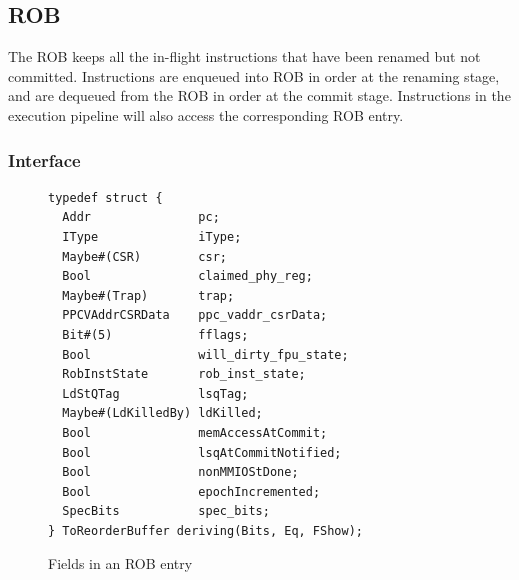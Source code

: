 \subsection{ROB}\label{sec:rob}

The ROB keeps all the in-flight instructions that have been renamed but not committed.
Instructions are enqueued into ROB in order at the renaming stage, and are dequeued from the ROB in order at the commit stage.
Instructions in the execution pipeline will also access the corresponding ROB entry.

\subsubsection{Interface}

\begin{figure}[!htb]
\begin{lstlisting}[caption={}]
typedef struct {
  Addr               pc;
  IType              iType;
  Maybe#(CSR)        csr;
  Bool               claimed_phy_reg;
  Maybe#(Trap)       trap;
  PPCVAddrCSRData    ppc_vaddr_csrData;
  Bit#(5)            fflags;
  Bool               will_dirty_fpu_state;
  RobInstState       rob_inst_state;
  LdStQTag           lsqTag;
  Maybe#(LdKilledBy) ldKilled;
  Bool               memAccessAtCommit;
  Bool               lsqAtCommitNotified;
  Bool               nonMMIOStDone;
  Bool               epochIncremented;
  SpecBits           spec_bits;
} ToReorderBuffer deriving(Bits, Eq, FShow);
\end{lstlisting}
\caption{Fields in an ROB entry}\label{fig:rob-entry}
\end{figure}

